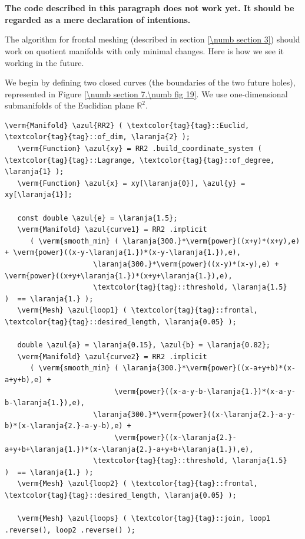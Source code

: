 \section{~~}
\label{\numb section 7.\numb parag 23}

{\normalfont\bfseries The code described in this paragraph does not work yet.
It should be regarded as a mere declaration of intentions.}
\medskip
{}

The algorithm for frontal meshing (described in section \ref{\numb section 3})
should work on quotient manifolds with only minimal changes.
Here is how we see it working in the future.

We begin by defining two closed curves (the boundaries of the two future holes),
represented in Figure \ref{\numb section 7.\numb fig 19}.
We use one-dimensional submanifolds of the Euclidian plane $ \mathbb{R}^2 $.

\begin{Verbatim}[commandchars=\\\{\},formatcom=\small\tt,frame=single,
   rulecolor=\color{moldura},baselinestretch=0.94,framesep=2mm         ]
   \verm{Manifold} \azul{RR2} ( \textcolor{tag}{tag}::Euclid, \textcolor{tag}{tag}::of_dim, \laranja{2} );
   \verm{Function} \azul{xy} = RR2 .build_coordinate_system ( \textcolor{tag}{tag}::Lagrange, \textcolor{tag}{tag}::of_degree, \laranja{1} );
   \verm{Function} \azul{x} = xy[\laranja{0}], \azul{y} = xy[\laranja{1}];

   const double \azul{e} = \laranja{1.5};
   \verm{Manifold} \azul{curve1} = RR2 .implicit 
      ( \verm{smooth_min} ( \laranja{300.}*\verm{power}((x+y)*(x+y),e) + \verm{power}((x-y-\laranja{1.})*(x-y-\laranja{1.}),e),
                     \laranja{300.}*\verm{power}((x-y)*(x-y),e) + \verm{power}((x+y+\laranja{1.})*(x+y+\laranja{1.}),e),
                     \textcolor{tag}{tag}::threshold, \laranja{1.5}                     )  == \laranja{1.} );
   \verm{Mesh} \azul{loop1} ( \textcolor{tag}{tag}::frontal, \textcolor{tag}{tag}::desired_length, \laranja{0.05} );
      
   double \azul{a} = \laranja{0.15}, \azul{b} = \laranja{0.82};
   \verm{Manifold} \azul{curve2} = RR2 .implicit 
      ( \verm{smooth_min} ( \laranja{300.}*\verm{power}((x-a+y+b)*(x-a+y+b),e) +
                          \verm{power}((x-a-y-b-\laranja{1.})*(x-a-y-b-\laranja{1.}),e),
                     \laranja{300.}*\verm{power}((x-\laranja{2.}-a-y-b)*(x-\laranja{2.}-a-y-b),e) +
                          \verm{power}((x-\laranja{2.}-a+y+b+\laranja{1.})*(x-\laranja{2.}-a+y+b+\laranja{1.}),e),
                     \textcolor{tag}{tag}::threshold, \laranja{1.5}                           )  == \laranja{1.} );
   \verm{Mesh} \azul{loop2} ( \textcolor{tag}{tag}::frontal, \textcolor{tag}{tag}::desired_length, \laranja{0.05} );

   \verm{Mesh} \azul{loops} ( \textcolor{tag}{tag}::join, loop1 .reverse(), loop2 .reverse() );                     
\end{Verbatim}

